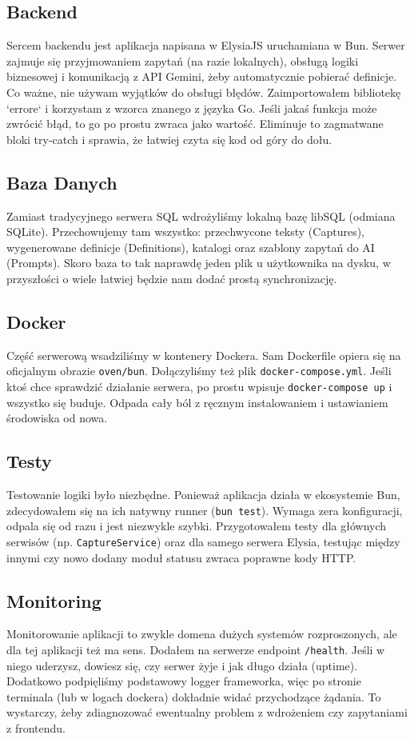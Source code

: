 \documentclass[times]{san}
\begin{document}
\subsection{Backend}
Sercem backendu jest aplikacja napisana w ElysiaJS uruchamiana w Bun. Serwer zajmuje się przyjmowaniem zapytań (na razie lokalnych), obsługą logiki biznesowej i komunikacją z API Gemini, żeby automatycznie pobierać definicje.
Co ważne, nie używam wyjątków do obsługi błędów. Zaimportowałem bibliotekę `errore` i korzystam z wzorca znanego z języka Go. Jeśli jakaś funkcja może zwrócić błąd, to go po prostu zwraca jako wartość. Eliminuje to zagmatwane bloki try-catch i sprawia, że łatwiej czyta się kod od góry do dołu.

\subsection{Baza Danych}
Zamiast tradycyjnego serwera SQL wdrożyliśmy lokalną bazę libSQL (odmiana SQLite). Przechowujemy tam wszystko: przechwycone teksty (Captures), wygenerowane definicje (Definitions), katalogi oraz szablony zapytań do AI (Prompts). Skoro baza to tak naprawdę jeden plik u użytkownika na dysku, w przyszłości o wiele łatwiej będzie nam dodać prostą synchronizację.

\subsection{Docker}
Część serwerową wsadziliśmy w kontenery Dockera. Sam Dockerfile opiera się na oficjalnym obrazie \texttt{oven/bun}. Dołączyliśmy też plik \texttt{docker-compose.yml}. Jeśli ktoś chce sprawdzić działanie serwera, po prostu wpisuje \texttt{docker-compose up} i wszystko się buduje. Odpada cały ból z ręcznym instalowaniem i ustawianiem środowiska od nowa.

\subsection{Testy}
Testowanie logiki było niezbędne. Ponieważ aplikacja działa w ekosystemie Bun, zdecydowałem się na ich natywny runner (\texttt{bun test}). Wymaga zera konfiguracji, odpala się od razu i jest niezwykle szybki. Przygotowałem testy dla głównych serwisów (np. \texttt{CaptureService}) oraz dla samego serwera Elysia, testując między innymi czy nowo dodany moduł statusu zwraca poprawne kody HTTP.

\subsection{Monitoring}
Monitorowanie aplikacji to zwykle domena dużych systemów rozproszonych, ale dla tej aplikacji też ma sens. Dodałem na serwerze endpoint \texttt{/health}. Jeśli w niego uderzysz, dowiesz się, czy serwer żyje i jak długo działa (uptime). Dodatkowo podpięliśmy podstawowy logger frameworka, więc po stronie terminala (lub w logach dockera) dokładnie widać przychodzące żądania. To wystarczy, żeby zdiagnozować ewentualny problem z wdrożeniem czy zapytaniami z frontendu.
\end{document}
